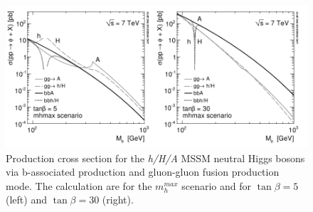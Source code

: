 \begin{figure}[tp]
     \begin{center}

            \includegraphics[width=\textwidth]{figure/xsec.png}

    \end{center}
    \caption{Production cross section for the \emph{h/H/A} MSSM neutral Higgs bosons via b-associated production and
	gluon-gluon fusion production mode. The calculation are for the $m_h^{max}$ scenario and for $\tan \beta=5$ (left) and $\tan \beta=30$ (right).}
   \label{fig:xsec}
\end{figure}


